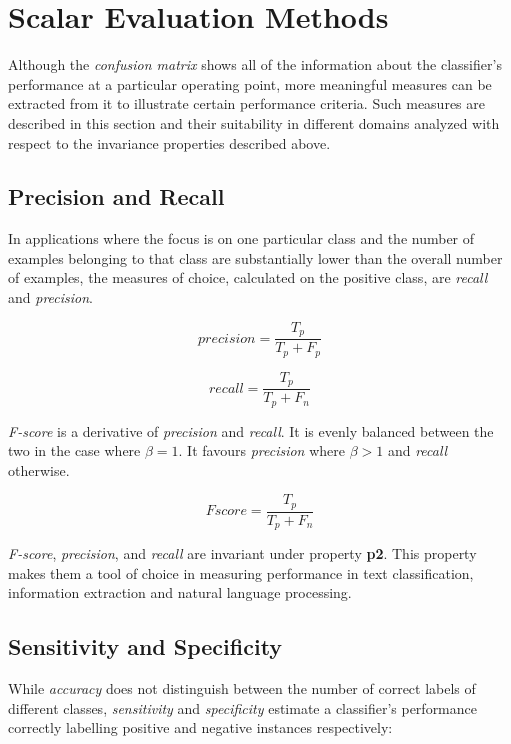 \documentclass[10pt]{unbthesis}
\begin{document}
\section{Scalar Evaluation Methods}
Although the \textit{confusion matrix} shows
all of the information about the classifier's performance at a
particular operating point, more
meaningful measures can be extracted from it to illustrate certain
performance criteria. Such measures are described in
this section and their suitability in different domains analyzed with
respect to the invariance properties described above.

\subsection{Precision and Recall}
In applications where the focus is on one particular class and the
number of examples belonging to that class are substantially lower
than the overall number of examples, the measures of
choice, calculated on the positive class, are \textit{recall} and
\textit{precision}.

\begin{equation}
\label{equ:precision}
precision = \frac{T_p}{T_p + F_p}
\end{equation}

\begin{equation}
\label{equ:recall}
recall = \frac{T_p}{T_p + F_n}
\end{equation}

\textit{F-score} is a derivative of \textit{precision} and
\textit{recall}. It is evenly balanced between the two in the case
where \(\beta = 1\). It favours \textit{precision} where \(\beta > 1\)
and \textit{recall} otherwise.

\begin{equation}
\label{equ:fscore}
Fscore = \frac{T_p}{T_p + F_n}
\end{equation}

\textit{F-score}, \textit{precision}, and \textit{recall} are
invariant under property \textbf{p2}. This property makes them a tool
of choice in measuring performance in text classification, information
extraction and natural language processing.


\subsection{Sensitivity and Specificity}
While \textit{accuracy} does not distinguish between the number of
correct labels of different classes, \textit{sensitivity} and
\textit{specificity} estimate a classifier's performance correctly
labelling positive and negative instances respectively:
\end{document}
